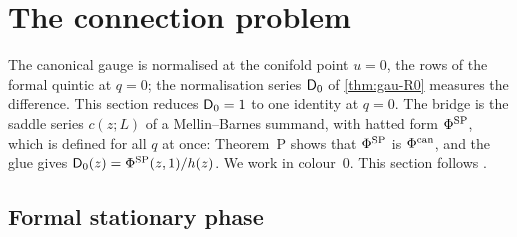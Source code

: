 \section{The connection problem}
\label{sec:con}

The canonical gauge is normalised at the conifold point $u=0$, the rows of the formal quintic at $q=0$; the normalisation series $\mathsf{D}_0$ of \cref{thm:gau-R0} measures the difference. This section reduces $\mathsf{D}_0=1$ to one identity at $q=0$. The bridge is the saddle series $c(z;L)$ of a Mellin--Barnes summand, with hatted form $\Phi^{\mathrm{SP}}$, which is defined for all $q$ at once: Theorem~P shows that $\Phi^{\mathrm{SP}}$ is $\Phi^{\mathrm{can}}$, and the glue gives $\mathsf{D}_0(z)=\Phi^{\mathrm{SP}}(z,1)/h(z)$. We work in colour~$0$. This section follows .

\subsection{Formal stationary phase}
\label{sec:con-fsp}

